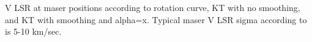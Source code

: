 \label{fig:maser_comparison} V LSR at maser positions according to \citet{1985ApJ...295..422C} rotation curve, KT with no smoothing, and KT with smoothing and alpha=x. Typical maser V LSR sigma according to \citet{2009ApJ...700..137R} is 5-10 km/sec.